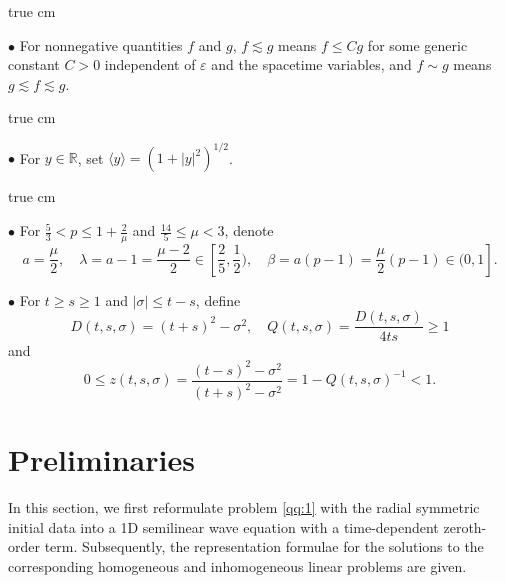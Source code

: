 \documentclass[11pt,twoside]{article}
\newcommand{\R}{\mathbb R}
\newcommand{\ve}{\varepsilon}
\newcommand{\f}{\frac}
\theoremstyle{plain}
\theoremstyle{definition}
\theoremstyle{remark}
\numberwithin{equation}{section}
\begin{document}
 true cm

$\bullet$ For nonnegative quantities $f$ and $g$, $f\lesssim g$ means
$f\leq Cg$ for some generic constant $C>0$ independent of $\ve$ and
the spacetime variables, and $f\sim g$ means
$g\lesssim f\lesssim g$.

 true cm


$\bullet$
For $y\in\R$, set $\langle y\rangle=(1+|y|^2)^{1/2}$.

 true cm



$\bullet$ For $\f{5}{3}<p\leq1+\f{2}{\mu}$ and $\f{14}{5}\leq\mu<3$, denote
\begin{equation*}\label{nota04}
a=\f{\mu}{2},\quad
\lambda=a-1=\f{\mu-2}{2}\in[\f{2}{5}, \f{1}{2}),\quad
\beta=a(p-1)=\f{\mu}{2}(p-1)\in(0, 1].
\end{equation*}


$\bullet$  For $t\geq s\geq1$ and $|\sigma|\leq t-s$, define
\begin{equation*}\label{nota01}
D(t,s,\sigma)=(t+s)^2-\sigma^2,\quad
Q(t,s,\sigma)=\f{D(t,s,\sigma)}{4ts}\geq1
\end{equation*}
and
\begin{equation*}\label{nota02}
0\leq z(t,s,\sigma)=
\f{(t-s)^2-\sigma^2}{(t+s)^2-\sigma^2}
=1-Q(t,s,\sigma)^{-1}<1.
\end{equation*}












\section{Preliminaries}\label{sec:preliminaries}

In this section, we first reformulate problem \eqref{qq:1} with the radial symmetric initial data into a 1D
semilinear wave equation with a time-dependent zeroth-order term. Subsequently, the representation formulae for the
solutions to the corresponding homogeneous
and inhomogeneous linear problems are given.
\end{document}
